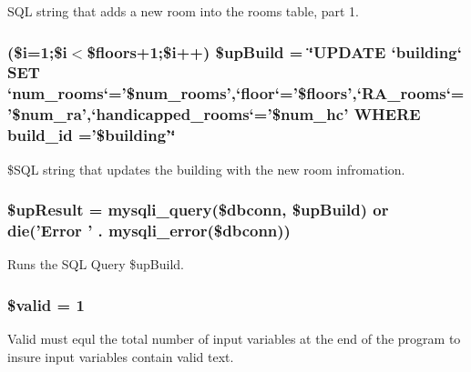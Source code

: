 \-S\-Q\-L string that adds a new room into the rooms table, part 1. \hypertarget{roomsVal_8php_af17c301fdf57702d6eafe21020b9b075}{
\subsubsection[{\$up\-Build}]{ (\$i=1;\$i$<$\$floors+1;\$i++) \$up\-Build = \char`\"{}\-U\-P\-D\-A\-T\-E `building` \-S\-E\-T `num\-\_\-rooms`='\$num\-\_\-rooms',`floor`='\$floors',`\-R\-A\-\_\-rooms`='\$num\-\_\-ra',`handicapped\-\_\-rooms`='\$num\-\_\-hc' \-W\-H\-E\-R\-E build\-\_\-id ='\$building'\char`\"{}}}\label{roomsVal_8php_af17c301fdf57702d6eafe21020b9b075}
\$\-S\-Q\-L string that updates the building with the new room infromation. \hypertarget{roomsVal_8php_a1b79716c00a22cc3e20b13c14978f455}{
\subsubsection[{\$up\-Result}]{\setlength{\rightskip}{0pt plus 5cm}\$up\-Result = mysqli\-\_\-query(\$dbconn, \$up\-Build) or die('\-Error ' . mysqli\-\_\-error(\$dbconn))}}\label{roomsVal_8php_a1b79716c00a22cc3e20b13c14978f455}
\-Runs the \-S\-Q\-L \-Query \$up\-Build. \hypertarget{roomsVal_8php_a0587674d27d00ef497e08e53ccf45bbb}{
\subsubsection[{\$valid}]{\setlength{\rightskip}{0pt plus 5cm}\$valid = 1}}\label{roomsVal_8php_a0587674d27d00ef497e08e53ccf45bbb}
\-Valid must equl the total number of input variables at the end of the program to insure input variables contain valid text. 